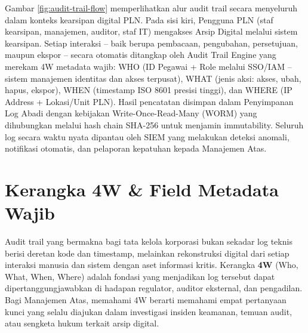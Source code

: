 \documentclass[12pt,a4paper]{report}
\begin{document}
\small Gambar \ref{fig:audit-trail-flow} memperlihatkan alur audit trail secara menyeluruh dalam konteks kearsipan digital PLN. Pada sisi kiri, Pengguna PLN (staf kearsipan, manajemen, auditor, staf IT) mengakses Arsip Digital melalui sistem kearsipan. Setiap interaksi -- baik berupa pembacaan, pengubahan, persetujuan, maupun ekspor -- secara otomatis ditangkap oleh Audit Trail Engine yang merekam 4W metadata wajib: WHO (ID Pegawai + Role melalui SSO/IAM -- sistem manajemen identitas dan akses terpusat), WHAT (jenis aksi: akses, ubah, hapus, ekspor), WHEN (timestamp ISO 8601 presisi tinggi), dan WHERE (IP Address + Lokasi/Unit PLN). Hasil pencatatan disimpan dalam Penyimpanan Log Abadi dengan kebijakan Write-Once-Read-Many (WORM) yang dihubungkan melalui hash chain SHA-256 untuk menjamin immutability. Seluruh log secara waktu nyata dipantau oleh SIEM yang melakukan deteksi anomali, notifikasi otomatis, dan pelaporan kepatuhan kepada Manajemen Atas.

\section{Kerangka 4W \& Field Metadata Wajib}
Audit trail yang bermakna bagi tata kelola korporasi bukan sekadar log teknis berisi deretan kode dan timestamp, melainkan rekonstruksi digital dari setiap interaksi manusia dan sistem dengan aset informasi kritis. Kerangka \textbf{4W} (Who, What, When, Where) adalah fondasi yang menjadikan log tersebut dapat dipertanggungjawabkan di hadapan regulator, auditor eksternal, dan pengadilan. Bagi Manajemen Atas, memahami 4W berarti memahami empat pertanyaan kunci yang selalu diajukan dalam investigasi insiden keamanan, temuan audit, atau sengketa hukum terkait arsip digital.
\end{document}
